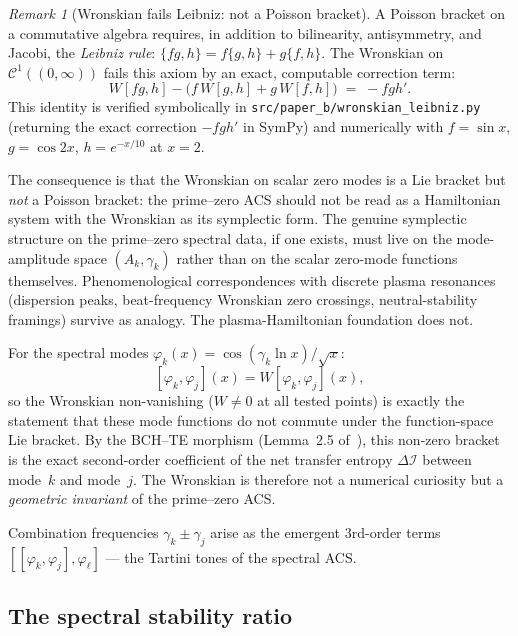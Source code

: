 \documentclass[11pt,a4paper]{article}
\theoremstyle{plain}
\theoremstyle{definition}
\theoremstyle{remark}
\newtheorem{remark}[theorem]{Remark}
\newcommand{\DI}{\Delta\mathcal{I}}
\begin{document}
\begin{remark}[Wronskian fails Leibniz: not a Poisson bracket]\label{rem:not-poisson}
A Poisson bracket on a commutative algebra requires, in addition to
bilinearity, antisymmetry, and Jacobi, the \emph{Leibniz rule}:
$\{fg, h\} = f\{g, h\} + g\{f, h\}$.  The Wronskian on
$\mathcal{C}^1((0,\infty))$ fails this axiom by an exact, computable
correction term:
\begin{equation}\label{eq:leibniz-failure}
  W[f g, h] - \bigl(f\, W[g, h] + g\, W[f, h]\bigr) \;=\; -f g h'.
\end{equation}
This identity is verified symbolically in
\texttt{src/paper\_b/wronskian\_leibniz.py} (returning the exact
correction $-fgh'$ in SymPy) and numerically with
$f = \sin x$, $g = \cos 2x$, $h = e^{-x/10}$ at $x = 2$.

The consequence is that the Wronskian on scalar zero modes is a
Lie bracket but \emph{not} a Poisson bracket: the prime--zero ACS
should not be read as a Hamiltonian system with the Wronskian as
its symplectic form.  The genuine symplectic structure on the prime--zero
spectral data, if one exists, must live on the mode-amplitude space
$(A_k, \gamma_k)$ rather than on the scalar zero-mode functions
themselves.  Phenomenological correspondences with discrete plasma
resonances (dispersion peaks, beat-frequency Wronskian zero crossings,
neutral-stability framings) survive as analogy.  The plasma-Hamiltonian
foundation does not.
\end{remark}

For the spectral modes $\varphi_k(x) = \cos(\gamma_k \ln x)/\sqrt{x}$:
\[
  [\varphi_k, \varphi_j](x) = W[\varphi_k, \varphi_j](x),
\]
so the Wronskian non-vanishing ($W \neq 0$ at all tested points)
is exactly the statement that these mode functions do not commute
under the function-space Lie bracket.  By the BCH--TE morphism
(Lemma~2.5 of~\cite{Wallace2026a}), this non-zero bracket is the
exact second-order coefficient of the net transfer entropy $\DI$
between mode~$k$ and mode~$j$.  The Wronskian is therefore not a
numerical curiosity but a \emph{geometric invariant} of the prime--zero ACS.

Combination frequencies $\gamma_k \pm \gamma_j$ arise as the emergent
3rd-order terms $[[\varphi_k, \varphi_j], \varphi_\ell]$ --- the
Tartini tones of the spectral ACS.

\subsection{The spectral stability ratio}
\end{document}
